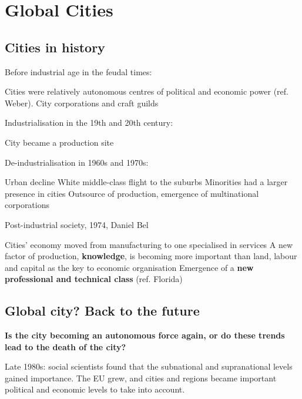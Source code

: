 \documentclass{article}
\begin{document}
\section{Global Cities}
\date{November 30th, 2021}

\subsection{Cities in history}

Before industrial age in the feudal times:

\begin{outline}
	\1 Cities were relatively autonomous centres of political and economic power (ref. Weber). 
	\1 City corporations and craft guilds
\end{outline}

Industrialisation in the 19th and 20th century:

\begin{outline}
	\1 
	\1 
	\1 City became a production site
\end{outline}

De-industrialisation in 1960s and 1970s:

\begin{outline}
	\1 Urban decline
	\1 White middle-class flight to the suburbs
	\1 Minorities had a larger presence in cities
	\1 Outsource of production, emergence of multinational corporations
\end{outline}

Post-industrial society, 1974, Daniel Bel

\begin{outline}
	\1 Cities' economy moved from manufacturing to one specialised in services
	\1 A new factor of production, \textbf{knowledge}, is becoming more important than land, labour and capital as the key to economic organisation
	\1 Emergence of a \textbf{new professional and technical class} (ref. Florida)
\end{outline}

\subsection{Global city? Back to the future}

\textbf{Is the city becoming an autonomous force again, or do these trends lead to the death of the city?}

Late 1980s: social scientists found that the subnational and supranational levels gained importance. The EU grew, and cities and regions became important political and economic levels to take into account.
\end{document}
